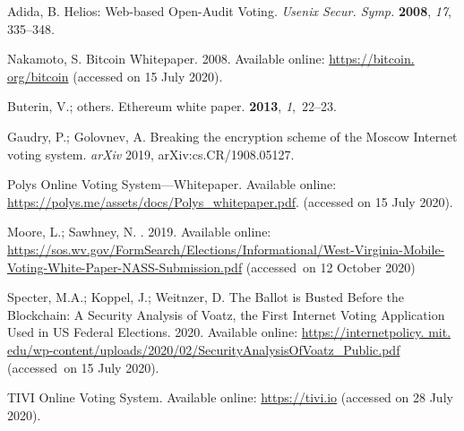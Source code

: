 \documentclass[applsci,article,accept,moreauthors,pdftex]{Definitions/mdpi}
\begin{document}
\begin{thebibliography}{999}
Adida, B.
\newblock Helios: Web-based Open-Audit Voting.
\newblock  \emph{Usenix Secur. Symp.}  \textbf{2008}, \emph{17},  335--348.


Nakamoto, S.
\newblock Bitcoin Whitepaper. 2008.  Available online:  \url{https://bitcoin. org/bitcoin}  ({accessed on 15 July 2020}).%

Buterin, V.; others.
\newblock Ethereum white paper.
 {\bf 2013}, {\em 1},~22--23.

Gaudry, P.; Golovnev, A.
\newblock Breaking the encryption scheme of the Moscow Internet voting system. \emph{arXiv}
  2019,  arXiv:cs.CR/1908.05127.

Polys Online Voting System---Whitepaper.   Available online:
\newblock \url{https://polys.me/assets/docs/Polys_whitepaper.pdf}.
\newblock (accessed on 15 July 2020).

Moore, L.; Sawhney, N.
.  2019.
Available online:   
\url{https://sos.wv.gov/FormSearch/Elections/Informational/West-Virginia-Mobile-Voting-White-Paper-NASS-Submission.pdf}
\newblock (accessed~on 12 October 2020)

Specter, M.A.; Koppel, J.; Weitnzer, D.
\newblock The Ballot is Busted Before the Blockchain: A Security Analysis of
  Voatz, the First Internet Voting Application Used in US Federal Elections. 2020. Available online:  \url{https://internetpolicy. mit.
  edu/wp-content/uploads/2020/02/SecurityAnalysisOfVoatz\_Public.pdf} ({accessed~on}  15 July 2020).

TIVI Online Voting System. Available online:  \url{https://tivi.io}  (accessed on 28 July 2020).


\end{thebibliography}
\end{document}
